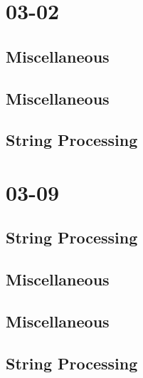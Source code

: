 \section{03-02}
\subsection{Miscellaneous}
\raggedbottom
\vspace{-.7\baselineskip}\hrulefill
\vspace{0.1\baselineskip}\subsection{Miscellaneous}
\raggedbottom
\vspace{-.7\baselineskip}\hrulefill
\vspace{0.1\baselineskip}\subsection{String Processing}
\raggedbottom
\vspace{-.7\baselineskip}\hrulefill
\vspace{0.1\baselineskip}
\section{03-09}
\subsection{String Processing}
\raggedbottom
\vspace{-.7\baselineskip}\hrulefill
\vspace{0.1\baselineskip}\subsection{Miscellaneous}
\raggedbottom
\vspace{-.7\baselineskip}\hrulefill
\vspace{0.1\baselineskip}\subsection{Miscellaneous}
\raggedbottom
\vspace{-.7\baselineskip}\hrulefill
\vspace{0.1\baselineskip}\subsection{String Processing}
\raggedbottom
\vspace{-.7\baselineskip}\hrulefill
\vspace{0.1\baselineskip}
